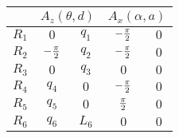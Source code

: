 \begin{tabular}{c|c|c|c|c|}  
            \cline{2-5} &
            \multicolumn{2}{|c|}{$A_z(\theta,d)$} &
            \multicolumn{2}{|c|}{$A_x(\alpha,a)$} \\
            \hline
        \multicolumn{1}{|c|}{$R_1$} & $0$ & $q_{1}$ & $-{{\pi}\over{2}}$ & $0$ \\
            \hline
        \multicolumn{1}{|c|}{$R_2$} & $-{{\pi}\over{2}}$ & $q_{2}$ & $-{{\pi}\over{2}}$ & $0$ \\
            \hline
        \multicolumn{1}{|c|}{$R_3$} & $0$ & $q_{3}$ & $0$ & $0$ \\
            \hline
        \multicolumn{1}{|c|}{$R_4$} & $q_{4}$ & $0$ & $-{{\pi}\over{2}}$ & $0$ \\
            \hline
        \multicolumn{1}{|c|}{$R_5$} & $q_{5}$ & $0$ & ${{\pi}\over{2}}$ & $0$ \\
            \hline
        \multicolumn{1}{|c|}{$R_6$} & $q_{6}$ & $L_{6}$ & $0$ & $0$ \\
            \hline
\end{tabular}
